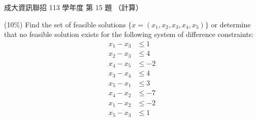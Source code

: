 \begin{pastexam}[label={px:ncku-113-prog-15}]{成大資訊聯招 113 學年度 第 15 題}
（計算）

(10\%) Find the set of feasible solutions $\{x=(x_1,x_2,x_3,x_4,x_5)\}$ or determine that no
feasible solution exists for the following system of difference constraints:
\begin{align*}
x_1-x_3&\le 1\\
x_2-x_3&\le 4\\
x_4-x_5&\le -2\\
x_3-x_4&\le 4\\
x_5-x_1&\le 3\\
x_4-x_2&\le -7\\
x_1-x_2&\le -2\\
x_5-x_3&\le 1
\end{align*}
\end{pastexam}

